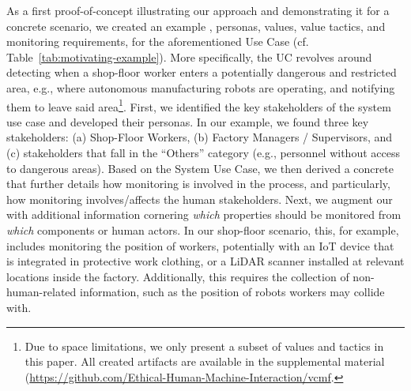 As a first proof-of-concept illustrating our approach and demonstrating it for a concrete scenario, we created an example \muc, personas, values, value tactics, and monitoring requirements, for the aforementioned Use Case (cf. Table~\ref{tab:motivating-example}).
More specifically, the UC revolves around detecting when a shop-floor worker enters a potentially dangerous and restricted area, e.g., where autonomous manufacturing robots are operating, and notifying them to leave said area\footnote{Due to space limitations, we only present a subset of values and tactics in this paper. All created artifacts are available in the supplemental material (\url{https://github.com/Ethical-Human-Machine-Interaction/vcmf}.}.
First, we identified the key stakeholders of the system use case and developed their personas. In our example, we found three key stakeholders: (a) Shop-Floor Workers, (b) Factory Managers / Supervisors, and (c) stakeholders that fall in the ``Others'' category (e.g., personnel without access to dangerous areas).
Based on the System Use Case, we then derived a concrete \muc that further details how monitoring is involved in the process, and particularly, how monitoring involves/affects the human stakeholders.
Next, we augment our \muc with additional information cornering \textit{which} properties should be monitored from \textit{which} components or human actors.
In our shop-floor scenario, this, for example, includes monitoring the position of workers, potentially with an IoT device that is integrated in protective work clothing, or a LiDAR scanner installed at relevant locations inside the factory. Additionally, this requires the collection of non-human-related information, such as the position of robots workers may collide with.

